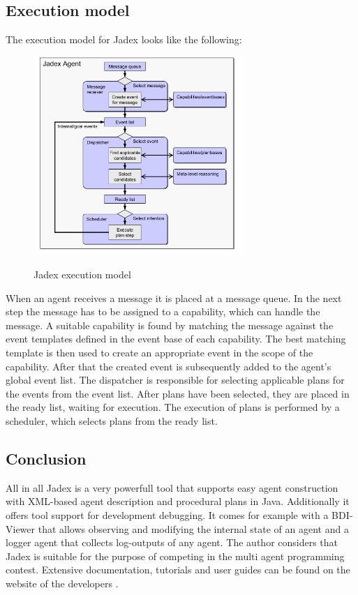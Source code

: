 \subsection{Execution model}
The execution model for Jadex looks like the following:
\begin{figure}
	\centering
	\includegraphics[width=300px]{images/Jadex_execution_model.png}
	\label{fig3}
	\caption{Jadex execution model \cite{Pokahr}}
\end{figure}
\newline
When an agent receives a message it is placed at a message queue. In the next step the message has to be assigned to a capability, which can handle the message. A suitable capability is found by matching the message against the event templates defined in the event base of each capability. The best matching template is then used to create an appropriate event in the scope of the capability. After that the created event is subsequently added to the agent's global event list. The dispatcher is responsible for selecting applicable plans for the events from the event list. After plans have been selected, they are placed in the ready list, waiting for execution. The execution of plans is performed by a scheduler, which selects plans from the ready list. 

\subsection{Conclusion}
All in all Jadex is a very powerfull tool that supports easy agent construction with XML-based agent description and procedural plans in Java. Additionally it offers tool support for development debugging. It comes for example with a BDI-Viewer that allows observing and modifying the internal state of an agent and a logger agent that collects log-outputs of any agent. The author considers that Jadex is suitable for the purpose of competing in the multi agent programming contest. Extensive documentation, tutorials and user guides can be found on the website of the developers \cite{Jadex}.
